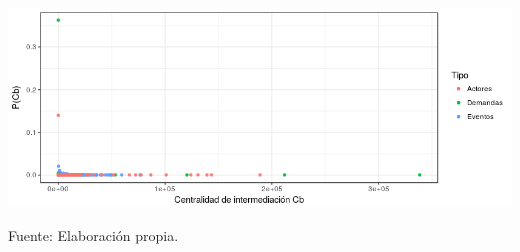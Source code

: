 \documentclass[letterpaper, 11pt]{book}
\theoremstyle{definition}
\theoremstyle{remark}
\begin{document}
\begin{minipage}{\linewidth}
\centering
{} \label{4.6_distribuciones_intermediacion}
\includegraphics[scale=0.7]{img/4.6_distribuciones_intermediacion.png}
\par
\small Fuente: Elaboración propia.
\end{minipage}\bigskip
\end{document}
